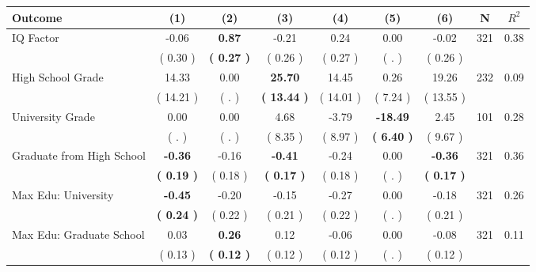 \begin{tabular}{lcccccccc}
\toprule
 \textbf{Outcome} & \textbf{(1)} & \textbf{(2)} & \textbf{(3)} & \textbf{(4)} & \textbf{(5)} & \textbf{(6)} & \textbf{N} & \textbf{$ R^2$} \\
\midrule
IQ Factor &     -0.06 & \textbf{     0.87} &     -0.21 &      0.24 &      0.00 &     -0.02 & 321 &       0.38 \\ 
 & (     0.30 ) & \textbf{(     0.27 )} & (     0.26 ) & (     0.27 ) & (        . ) & (     0.26 ) & \\
High School Grade &     14.33 &      0.00 & \textbf{    25.70} &     14.45 &      0.26 &     19.26 & 232 &       0.09 \\ 
 & (    14.21 ) & (        . ) & \textbf{(    13.44 )} & (    14.01 ) & (     7.24 ) & (    13.55 ) & \\
University Grade &      0.00 &      0.00 &      4.68 &     -3.79 & \textbf{   -18.49} &      2.45 & 101 &       0.28 \\ 
 & (        . ) & (        . ) & (     8.35 ) & (     8.97 ) & \textbf{(     6.40 )} & (     9.67 ) & \\
Graduate from High School & \textbf{    -0.36} &     -0.16 & \textbf{    -0.41} &     -0.24 &      0.00 & \textbf{    -0.36} & 321 &       0.36 \\ 
 & \textbf{(     0.19 )} & (     0.18 ) & \textbf{(     0.17 )} & (     0.18 ) & (        . ) & \textbf{(     0.17 )} & \\
Max Edu: University & \textbf{    -0.45} &     -0.20 &     -0.15 &     -0.27 &      0.00 &     -0.18 & 321 &       0.26 \\ 
 & \textbf{(     0.24 )} & (     0.22 ) & (     0.21 ) & (     0.22 ) & (        . ) & (     0.21 ) & \\
Max Edu: Graduate School &      0.03 & \textbf{     0.26} &      0.12 &     -0.06 &      0.00 &     -0.08 & 321 &       0.11 \\ 
 & (     0.13 ) & \textbf{(     0.12 )} & (     0.12 ) & (     0.12 ) & (        . ) & (     0.12 ) & \\
\bottomrule
\end{tabular}
